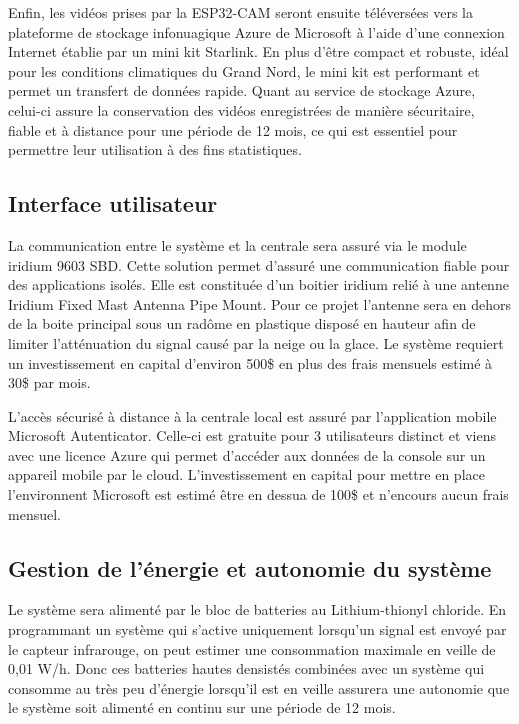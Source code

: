 \bigskip
Enfin, les vidéos prises par la ESP32-CAM seront ensuite téléversées vers la plateforme de stockage infonuagique Azure de Microsoft à l’aide d’une connexion Internet établie 
par un mini kit Starlink. En plus d’être compact et robuste, idéal pour les conditions climatiques du Grand Nord, le mini kit est performant et permet un transfert de données 
rapide. Quant au service de stockage Azure, celui-ci assure la conservation des vidéos enregistrées de manière sécuritaire, fiable et à distance pour une période de 12 mois, 
ce qui est essentiel pour permettre leur utilisation à des fins statistiques.

\subsection{Interface utilisateur}
La communication entre le système et la centrale sera assuré via le module iridium 9603 SBD. Cette solution permet d’assuré une communication fiable pour des applications isolés. Elle est constituée d’un boitier iridium relié à une antenne Iridium Fixed Mast Antenna Pipe Mount.  Pour ce projet l’antenne sera en dehors de la boite principal sous un radôme en plastique disposé en hauteur afin de limiter l’atténuation du signal causé par la neige ou la glace. Le système requiert un investissement en capital d’environ 500\$ en plus des frais mensuels estimé à 30\$ par mois. 

\bigskip
L’accès sécurisé à distance à la centrale local est assuré par l’application mobile Microsoft Autenticator. Celle-ci est gratuite pour 3 utilisateurs distinct et viens avec une licence Azure qui permet d’accéder aux données de la console sur un appareil mobile par le cloud. L’investissement en capital pour mettre en place l’environnent Microsoft est estimé être en dessua de 100\$ et n’encours aucun frais mensuel. 

\subsection{Gestion de l'énergie et autonomie du système}
Le système sera alimenté par le bloc de batteries au Lithium-thionyl chloride.
En programmant un système qui s'active uniquement lorsqu'un signal est envoyé par le capteur infrarouge, 
on peut estimer une consommation maximale en veille de 0,01 W/h. Donc ces batteries hautes densistés combinées avec un système qui 
consomme au très peu d'énergie lorsqu'il est en veille assurera une autonomie que le système soit alimenté en continu sur une période de 12 mois.


